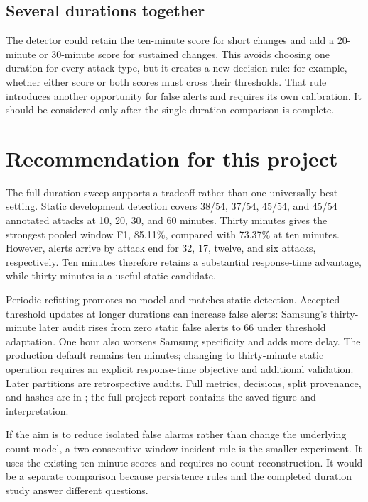 \documentclass[11pt,a4paper]{article}
\begin{document}
\subsection{Several durations together}

The detector could retain the ten-minute score for short changes and add a
20-minute or 30-minute score for sustained changes.  This avoids choosing one
duration for every attack type, but it creates a new decision rule: for example,
whether either score or both scores must cross their thresholds.  That rule
introduces another opportunity for false alerts and requires its own
calibration.  It should be considered only after the single-duration comparison
is complete.

\section{Recommendation for this project}

The full duration sweep supports a tradeoff rather than one universally best
setting. Static development detection covers 38/54, 37/54, 45/54, and 45/54
annotated attacks at 10, 20, 30, and 60 minutes. Thirty minutes gives the
strongest pooled window F1, 85.11\%, compared with 73.37\% at ten minutes.
However, alerts arrive by attack end for 32, 17, twelve, and six attacks,
respectively. Ten minutes therefore retains a substantial response-time
advantage, while thirty minutes is a useful static candidate.

Periodic refitting promotes no model and matches static detection. Accepted
threshold updates at longer durations can increase false alerts: Samsung's
thirty-minute later audit rises from zero static false alerts to 66 under
threshold adaptation. One hour also worsens Samsung specificity and adds more
delay. The production default remains ten minutes; changing to thirty-minute
static operation requires an explicit response-time objective and additional
validation. Later partitions are retrospective audits. Full metrics,
decisions, split provenance, and hashes are in ;
the full project report contains the saved figure and interpretation.

If the aim is to reduce isolated false alarms rather than change the underlying
count model, a two-consecutive-window incident rule is the smaller experiment.
It uses the existing ten-minute scores and requires no count reconstruction.
It would be a separate comparison because persistence rules and the completed
duration study answer different questions.
\end{document}
